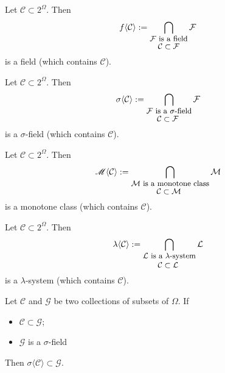 \begin{theorem}
Let $\mathcal C\subset 2^\Omega$. Then
\begin{equation}
\nonumber
f\langle\mathcal C \rangle := \bigcap_{\shortstack{\text{\small $\mathcal F$ is a field}  \\
 \text{\small $\mathcal C\subset \mathcal F$} }}\mathcal F
\end{equation}
is a field (which contains $\mathcal C$).
\end{theorem}


\begin{theorem}
Let $\mathcal C\subset 2^\Omega$. Then
\begin{equation}
\nonumber
\sigma\langle\mathcal C \rangle := \bigcap_{\shortstack{\text{\small $\mathcal F$ is a $\sigma$-field}  \\
 \text{\small$\mathcal C\subset \mathcal F$ }}}\mathcal F
\end{equation}
is a $\sigma$-field (which contains $\mathcal C$).
\end{theorem}

\begin{theorem}
Let $\mathcal C\subset 2^\Omega$. Then
\begin{equation}
\nonumber
 \mathscr M\langle\mathcal C \rangle := \bigcap_{\shortstack{\text{\small $\mathcal M$ is a monotone class}  \\
 \text{\small$\mathcal C\subset \mathcal M$ }}}\mathcal M
\end{equation}
is a monotone class (which contains $\mathcal C$).
\end{theorem}






\begin{theorem}
Let $\mathcal C\subset 2^\Omega$. Then
\begin{equation}
\nonumber
\lambda\langle\mathcal C \rangle := \bigcap_{\shortstack{\text{\small $\mathcal L$ is a $\lambda$-system}  \\
 \text{\small$\mathcal C\subset \mathcal L$ }}}\mathcal L
\end{equation}
is a $\lambda$-system (which contains $\mathcal C$).
\end{theorem}




\begin{theorem}
Let $\mathcal C$ and $\mathcal G$ be two collections of subsets of $\Omega$. If
\begin{itemize}
\item $\mathcal C\subset \mathcal G$;
\item $\mathcal G$ is a $\sigma$-field
\end{itemize}
Then  $\sigma\langle\mathcal C\rangle\subset \mathcal G$.
\end{theorem}


